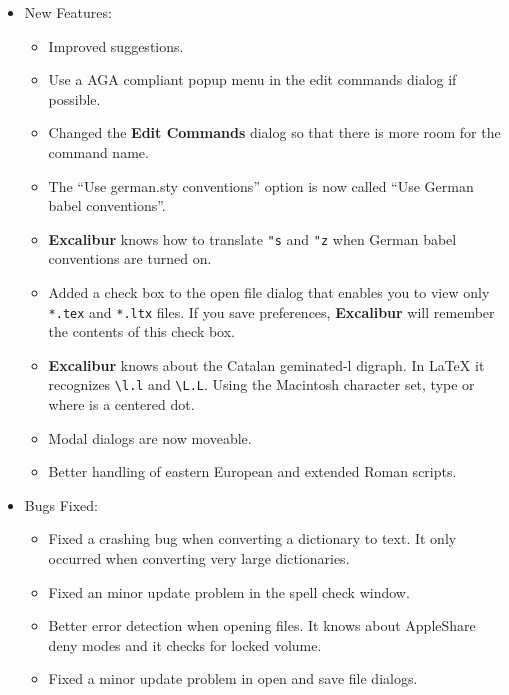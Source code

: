 ﻿\documentclass[11pt,titlepage]{article}
\newcommand{\ex}{\textbf{Excalibur}}
\begin{document}
\begin{itemize}
\item New Features:

  \begin{itemize}
  \item Improved suggestions.

  \item Use a AGA compliant popup menu in the edit commands dialog if
    possible.

  \item Changed the \textbf{Edit Commands} dialog so that there is
    more room for the command name.

  \item The ``Use german.sty conventions'' option is now called ``Use
    German babel conventions''.

  \item \ex{} knows how to translate \texttt{"s} and \texttt{"z} when
    German babel conventions are turned on.

  \item Added a check box to the open file dialog that enables you to
    view only \texttt{*.tex} and \texttt{*.ltx} files.  If you save
    preferences, \ex{} will remember the contents of this check box.

  \item \ex{} knows about the Catalan geminated-l digraph.  In
    \LaTeX{} it recognizes \verb+\l.l+ and \verb+\L.L+.  Using the
    Macintosh character set, type
     or
     where
    \latex{$\cdot$} is a centered dot.

  \item Modal dialogs are now moveable.

  \item Better handling of eastern European and extended Roman
    scripts.
  \end{itemize}

\item Bugs Fixed:

  \begin{itemize}
  \item Fixed a crashing bug when converting a dictionary to text.  It
    only occurred when converting very large dictionaries.

  \item Fixed an minor update problem in the spell check window.

  \item Better error detection when opening files.  It knows about
    AppleShare deny modes and it checks for locked volume.

  \item Fixed a minor update problem in open and save file dialogs.

  \end{itemize}

\end{itemize}
\end{document}
